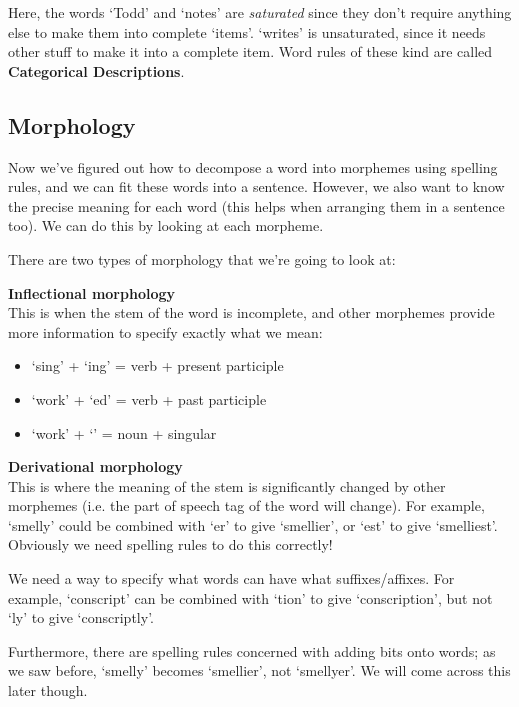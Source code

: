 Here, the words `Todd' and `notes' are \textit{saturated} since they don't
require anything else to make them into complete `items'. `writes' is
unsaturated, since it needs other stuff to make it into a complete item. Word
rules of these kind are called \textbf{Categorical Descriptions}.

\subsection{Morphology}

Now we've figured out how to decompose a word into morphemes using spelling
rules, and we can fit these words into a sentence. However, we also want to know the precise meaning for each word (this helps when arranging them in a sentence too). We can do this by looking at each morpheme.

There are two types of morphology that we're going to look at:

\begin{description}
  \item \textbf{Inflectional morphology}\\
    This is when the stem of the word is incomplete, and other morphemes 
    provide more information to specify exactly what we mean:

    \begin{itemize}
      \item `sing' + `ing' = verb + present participle
      \item `work' + `ed' = verb + past participle
      \item `work' + `' = noun + singular
    \end{itemize}

  \item \textbf{Derivational morphology}\\
    This is where the meaning of the stem is significantly changed by other 
    morphemes (i.e. the part of speech tag of the word will change). For
    example, `smelly' could be combined with `er' to give `smellier', or `est'
    to give `smelliest'. Obviously we need spelling rules to do this correctly!
\end{description}

We need a way to specify what words can have what suffixes/affixes. For example,
`conscript' can be combined with `tion' to give `conscription', but not `ly' to
give `conscriptly'.

Furthermore, there are spelling rules concerned with adding bits onto words; as
we saw before, `smelly' becomes `smellier', not `smellyer'. We will come across
this later though.

